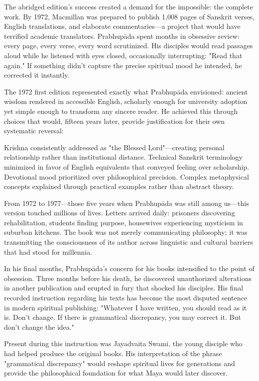 \documentclass[12pt,twoside]{book}
\begin{document}
The abridged edition's success created a demand for the impossible: the complete work. By 1972, Macmillan was prepared to publish 1,008 pages of Sanskrit verses, English translations, and elaborate commentaries—a project that would have terrified academic translators. Prabhupāda spent months in obsessive review: every page, every verse, every word scrutinized. His disciples would read passages aloud while he listened with eyes closed, occasionally interrupting: "Read that again." If something didn't capture the precise spiritual mood he intended, he corrected it instantly.

The 1972 first edition represented exactly what Prabhupāda envisioned: ancient wisdom rendered in accessible English, scholarly enough for university adoption yet simple enough to transform any sincere reader. He achieved this through choices that would, fifteen years later, provide justification for their own systematic reversal:

Krishna consistently addressed as "the Blessed Lord"—creating personal relationship rather than institutional distance. Technical Sanskrit terminology minimized in favor of English equivalents that conveyed feeling over scholarship. Devotional mood prioritized over philosophical precision. Complex metaphysical concepts explained through practical examples rather than abstract theory.

From 1972 to 1977—those five years when Prabhupāda was still among us—this version touched millions of lives. Letters arrived daily: prisoners discovering rehabilitation, students finding purpose, housewives experiencing mysticism in suburban kitchens. The book was not merely communicating philosophy; it was transmitting the consciousness of its author across linguistic and cultural barriers that had stood for millennia.

In his final months, Prabhupāda's concern for his books intensified to the point of obsession. Three months before his death, he discovered unauthorized alterations in another publication and erupted in fury that shocked his disciples. His final recorded instruction regarding his texts has become the most disputed sentence in modern spiritual publishing: "Whatever I have written, you should read as it is. Don't change. If there is grammatical discrepancy, you may correct it. But don't change the idea."

Present during this instruction was Jayadvaita Swami, the young disciple who had helped produce the original books. His interpretation of the phrase "grammatical discrepancy" would reshape spiritual lives for generations and provide the philosophical foundation for what Maya would later discover.
\end{document}
